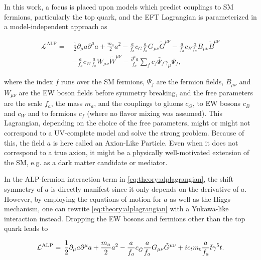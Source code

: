 In this work, a focus is placed upon models which predict couplings to SM fermions, particularly the top quark, and the EFT Lagrangian is parameterized in a model-independent approach as~\cite{Georgi:1986df}

\begin{equation}
\begin{split}
\label{eq:theory:alplagrangian}
    \mathcal{L}^{\mathrm{ALP}} =& \, \frac{1}{2} \partial_\mu a \partial^\mu a
    + \frac{m_a}{2} a^2
    - \frac{a}{f_a} c_G \frac{a}{f_a} G_{\mu \nu} \tilde{G}^{\mu \nu}
    - \frac{a}{f_a} c_B \frac{a}{f_a} B_{\mu \nu} \tilde{B}^{\mu \nu} \\
    & - \frac{a}{f_a} c_W \frac{a}{f_a} W_{\mu \nu} \tilde{W}^{\mu \nu}
    - \frac{\partial^\mu a}{f_a} \sum_f c_f \bar{\Psi}_f \gamma_\mu \Psi_f ,
\end{split}
\end{equation}

\noindent where the index $f$ runs over the SM fermions, $\Psi_f$ are the fermion fields, $B_{\mu \nu}$ and $W_{\mu \nu}$ are the EW boson fields before symmetry breaking, and the free parameters are the scale $f_a$, the mass $m_a$, and the couplings to gluons $c_G$, to EW bosons $c_B$ and $c_W$ and to fermions $c_f$ (where no flavor mixing was assumed). This Lagrangian, depending on the choice of the free parameters, might or might not correspond to a UV-complete model and solve the strong \CP problem. Because of this, the field $a$ is here called an Axion-Like Particle. Even when it does not correspond to a true axion, it might be a physically well-motivated extension of the SM, e.g. as a dark matter candidate or mediator.

In the ALP-fermion interaction term in \cref{eq:theory:alplagrangian}, the shift symmetry of $a$ is directly manifest since it only depends on the derivative of $a$. However, by employing the equations of motion for $a$ as well as the Higgs mechanism, one can rewrite \cref{eq:theory:alplagrangian} with a Yukawa-like interaction instead. Dropping the EW bosons and fermions other than the top quark leads to

\begin{equation}
\label{eq:theory:alplagrangian2}
    \mathcal{L}^{\mathrm{ALP}} = \, \frac{1}{2} \partial_\mu a \partial^\mu a
    + \frac{m_a}{2} a^2
    - \frac{a}{f_a} c_{\tilde{G}} \frac{a}{f_a} G_{\mu \nu} \tilde{G}^{\mu \nu}
    + i c_t m_{\mathrm{t}} \frac{a}{f_a} \bar{t} \gamma^5 t .
\end{equation}

